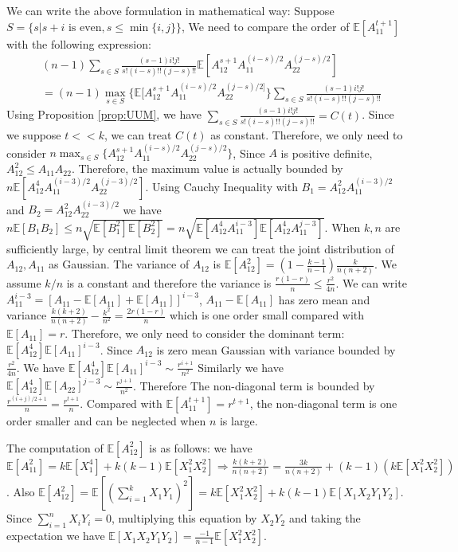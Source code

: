 \documentclass{article}
\def\E{\mathbb{E}}
\begin{document}
We can write the above formulation in mathematical way:
Suppose $S=\{s| s+i \textrm{ is even}, s\leq \min\{i,j\} \}$,
We need to compare the order of $\E[A_{11}^{t+1}]$ with the following expression:
\begin{align*}
&(n-1) \sum_{s \in S}
\frac{(s-1)i!j!}{s!(i-s)!!(j-s)!!}
\E[A_{12}^{s+1} A_{11}^{(i - s) /2}A_{22}^{(j - s)/2}]\\
&=(n-1) \max_{s\in S}\{\E[A_{12}^{s+1} A_{11}^{(i - s) /2}A_{22}^{(j - s)/2]}\}\sum_{s \in S}
\frac{(s-1)i!j!}{s!(i-s)!!(j-s)!!}
\end{align*}
Using Proposition \ref{prop:UUM}, we have 
$\sum_{s \in S}
\frac{(s-1)i!j!}{s!(i-s)!!(j-s)!!} = C(t)$. Since we suppose $t << k$, we can treat $C(t)$ as constant.
Therefore, we only need to consider $n\max_{s\in S}\{A_{12}^{s+1} A_{11}^{(i- s) /2}A_{22}^{(j- s)/2}\}$,
Since $A$ is positive definite, $A_{12}^2 \leq A_{11}A_{22}$. Therefore, the maximum value is actually bounded by
$n \E[A_{12}^4 A_{11}^{(i-3)/2} A_{22}^{(j-3)/2}]$. Using Cauchy Inequality with $B_1 = A_{12}^2 A_{11}^{(i-3)/2}$ and $B_2 = A_{12}^2 A_{22}^{(i-3)/2}$ we have $n\E[B_1B_2] \leq n \sqrt{\E[B_1^2] \E[B_2^2]} = n  \sqrt{\E[ A_{12}^4 A_{11}^{i-3} ]\E[ A_{12}^4 A_{11}^{j-3} ]}$. When $k, n$ are sufficiently large, by central limit theorem we can treat the joint distribution of $A_{12}, A_{11}$ as Gaussian. The variance of $A_{12}$ is $\E[A^2_{12}]=(1-\frac{k-1}{n-1}) \frac{k}{n(n+2)}$. We assume $k/n$ is a constant and therefore the variance is $\frac{r(1-r)}{n} \leq \frac{r^2}{4n}$. We can write $A_{11}^{i-3} = [A_11 - \E[A_{11}] + \E[A_{11}]]^{i-3}$, $A_{11} - \E[A_{11}]$ has zero mean and variance $\frac{k(k+2)}{n(n+2)} - \frac{k^2}{n^2} = \frac{2r(1-r)}{n}$ which is one order small compared with $\E[A_{11}] = r$. Therefore, we only need to consider the dominant term: $\E[A^4_{12}]\E[A_{11}]^{i-3}$. Since $A_{12}$ is zero mean Gaussian with variance bounded by $\frac{r^2}{4n}$.  We have $ \E[A^4_{12}]\E[A_{11}]^{i-3} \sim \frac{r^{i+1}}{n^2}$ Similarly we have $ \E[A^4_{12}]\E[A_{22}]^{j-3} \sim \frac{r^{j+1}}{n^2}$. Therefore
The non-diagonal term is bounded by $\frac{r^{(i+j)/2+1}}{n} = \frac{r^{t+1}}{n}$. Compared with $\E[A_{11}^{t+1}] = r^{t+1}$, the non-diagonal term is one order smaller and can be neglected when $n$ is large. 

The computation of $\E[A^2_{12}]$ is as follows:
we have $\E[A_{11}^2] = k\E[X_1^4] + k(k-1)\E[X_1^2 X_2^2] \Rightarrow
\frac{k(k+2)}{n(n+2)} = \frac{3k}{n(n+2)} + (k-1) (k \E[X_1^2 X_2^2])$.
Also $\E[A_{12}^2] = \E[(\sum_{i=1}^k X_1 Y_1)^2]
= k \E[X_1^2X^2_2] + k(k-1)\E[X_1X_2Y_1Y_2]
$.
Since $\sum_{i=1}^n X_i Y_i = 0$, multiplying this equation by $X_2Y_2$ and taking the expectation
we have $\E[X_1X_2Y_1Y_2] = \frac{-1}{n-1} \E[X_1^2 X_2^2]$.
\end{document}
